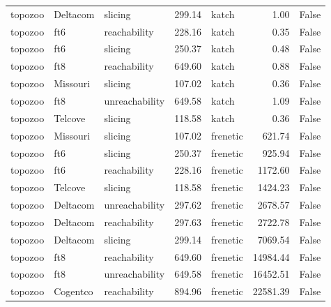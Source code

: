 \begin{tabular}{lllrlrr}
topozoo & Deltacom & slicing & 299.14 & katch & 1.00 & False \\
topozoo & ft6 & reachability & 228.16 & katch & 0.35 & False \\
topozoo & ft6 & slicing & 250.37 & katch & 0.48 & False \\
topozoo & ft8 & reachability & 649.60 & katch & 0.88 & False \\
topozoo & Missouri & slicing & 107.02 & katch & 0.36 & False \\
topozoo & ft8 & unreachability & 649.58 & katch & 1.09 & False \\
topozoo & Telcove & slicing & 118.58 & katch & 0.36 & False \\
topozoo & Missouri & slicing & 107.02 & frenetic & 621.74 & False \\
topozoo & ft6 & slicing & 250.37 & frenetic & 925.94 & False \\
topozoo & ft6 & reachability & 228.16 & frenetic & 1172.60 & False \\
topozoo & Telcove & slicing & 118.58 & frenetic & 1424.23 & False \\
topozoo & Deltacom & unreachability & 297.62 & frenetic & 2678.57 & False \\
topozoo & Deltacom & reachability & 297.63 & frenetic & 2722.78 & False \\
topozoo & Deltacom & slicing & 299.14 & frenetic & 7069.54 & False \\
topozoo & ft8 & reachability & 649.60 & frenetic & 14984.44 & False \\
topozoo & ft8 & unreachability & 649.58 & frenetic & 16452.51 & False \\
topozoo & Cogentco & reachability & 894.96 & frenetic & 22581.39 & False \\
\bottomrule
\end{tabular}
